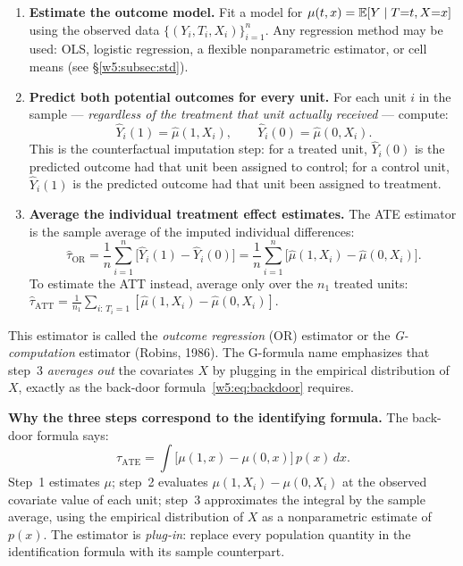 \documentclass[master.tex]{subfiles}
\begin{document}
\begin{tcolorbox}[defstyle, title={The Three-Step Recipe: Outcome Regression / G-Formula}]
\begin{enumerate}
  \item \textbf{Estimate the outcome model.}
    Fit a model for $\mu(t,x) = \mathbb{E}[Y \mid T{=}t, X{=}x]$ using the
    observed data $\{(Y_i, T_i, X_i)\}_{i=1}^n$.  Any regression
    method may be used: OLS, logistic regression, a flexible
    nonparametric estimator, or cell means (see §\ref{w5:subsec:std}).

  \item \textbf{Predict both potential outcomes for every unit.}
    For each unit $i$ in the sample --- \emph{regardless of the treatment
    that unit actually received} --- compute:
    \[
      \hat{Y}_i(1) = \hat\mu(1, X_i),
      \qquad
      \hat{Y}_i(0) = \hat\mu(0, X_i).
    \]
    This is the counterfactual imputation step: for a treated unit,
    $\hat{Y}_i(0)$ is the predicted outcome had that unit been assigned
    to control; for a control unit, $\hat{Y}_i(1)$ is the predicted
    outcome had that unit been assigned to treatment.

  \item \textbf{Average the individual treatment effect estimates.}
    The ATE estimator is the sample average of the imputed individual
    differences:
    \begin{equation}
      \hat\tau_{\mathrm{OR}}
      = \frac{1}{n}\sum_{i=1}^n
        \bigl[\hat{Y}_i(1) - \hat{Y}_i(0)\bigr]
      = \frac{1}{n}\sum_{i=1}^n
        \bigl[\hat\mu(1, X_i) - \hat\mu(0, X_i)\bigr].
      \label{w5:eq:or}
    \end{equation}
    To estimate the ATT instead, average only over the $n_1$ treated
    units: $\hat\tau_{\mathrm{ATT}} = \frac{1}{n_1}\sum_{i:\,T_i=1}
    [\hat\mu(1,X_i) - \hat\mu(0,X_i)]$.
\end{enumerate}
\end{tcolorbox}

\noindent This estimator is called the \emph{outcome regression} (OR)
estimator or the \emph{G-computation} estimator (Robins, 1986).  The
G-formula name emphasizes that step~3 \emph{averages out} the
covariates $X$ by plugging in the empirical distribution of $X$,
exactly as the back-door formula~\eqref{w5:eq:backdoor} requires.

\medskip\noindent\textbf{Why the three steps correspond to the
identifying formula.}  The back-door formula says:
\[
  \tau_{\mathrm{ATE}}
  = \int \bigl[\mu(1,x) - \mu(0,x)\bigr]\, p(x)\, dx.
\]
Step~1 estimates $\mu$; step~2 evaluates $\mu(1,X_i) - \mu(0,X_i)$
at the observed covariate value of each unit; step~3 approximates the
integral by the sample average, using the empirical distribution of
$X$ as a nonparametric estimate of $p(x)$.  The estimator is
\emph{plug-in}: replace every population quantity in the identification
formula with its sample counterpart.
\end{document}
